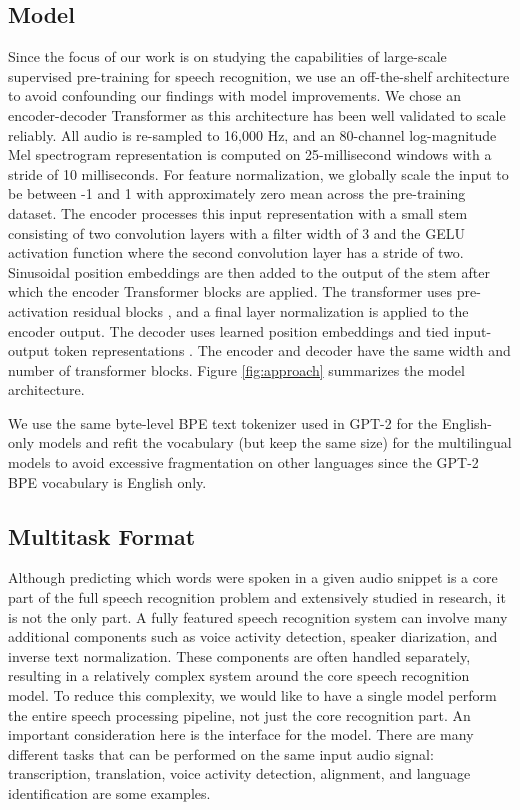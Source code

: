 \documentclass[nohyperref]{article}
\theoremstyle{plain}
\theoremstyle{definition}
\theoremstyle{remark}
\begin{document}
\subsection{Model}\label{subsec:model}

Since the focus of our work is on studying the capabilities of large-scale supervised pre-training for speech recognition, we use an off-the-shelf architecture to avoid confounding our findings with model improvements. We chose an encoder-decoder Transformer \cite{vaswani2017transformer} as this architecture has been well validated to scale reliably. All audio is re-sampled to 16,000 Hz, and an 80-channel log-magnitude Mel spectrogram representation is computed on 25-millisecond windows with a stride of 10 milliseconds. For feature normalization, we globally scale the input to be between -1 and 1 with approximately zero mean across the pre-training dataset. The encoder processes this input representation with a small stem consisting of two convolution layers with a filter width of 3 and the GELU activation function \cite{hendrycks2016gaussian} where the second convolution layer has a stride of two. Sinusoidal position embeddings are then added to the output of the stem after which the encoder Transformer blocks are applied. The transformer uses pre-activation residual blocks \cite{child2019generating}, and a final layer normalization is applied to the encoder output. The decoder uses learned position embeddings and tied input-output token representations \cite{press-wolf-2017-using}. The encoder and decoder have the same width and number of transformer blocks.
Figure \ref{fig:approach} summarizes the model architecture.

We use the same byte-level BPE text tokenizer used in GPT-2 \cite{sennrich2015neural,radford2019gpt2} for the English-only models and refit the vocabulary (but keep the same size) for the multilingual models to avoid excessive fragmentation on other languages since the GPT-2 BPE vocabulary is English only.

\subsection{Multitask Format}\label{sec:multitask}

Although predicting which words were spoken in a given audio snippet is a core part of the full speech recognition problem and extensively studied in research, it is not the only part. A fully featured speech recognition system can involve many additional components such as voice activity detection, speaker diarization, and inverse text normalization. These components are often handled separately, resulting in a relatively complex system around the core speech recognition model. To reduce this complexity, we would like to have a single model perform the entire speech processing pipeline, not just the core recognition part. An important consideration here is the interface for the model. There are many different tasks that can be performed on the same input audio signal: transcription, translation, voice activity detection, alignment, and language identification are some examples. 
\end{document}
